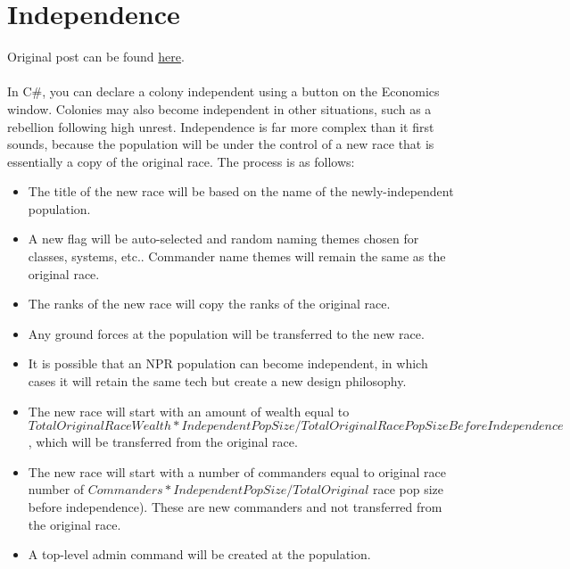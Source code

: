 \documentclass[../../Aurora C# unofficial manual.tex]{subfiles}
\begin{document}
		\section{Independence}\label{6_independence}
	Original post can be found
	\href{http://aurora2.pentarch.org/index.php?topic=8495.msg118467#msg118467}{here}.
	\\\\
	In C\#, you can declare a colony independent using a button on the Economics window. Colonies may also become independent in other situations, such as a rebellion following high unrest. Independence is far more complex than it first sounds, because the population will be under the control of a new race that is essentially a copy of the original race. The process is as follows:
	\begin{itemize}
		\item The title of the new race will be based on the name of the newly-independent population.
		\item A new flag will be auto-selected and random naming themes chosen for classes, systems, etc.. Commander name themes will remain the same as the original race.
		\item The ranks of the new race will copy the ranks of the original race.
		\item Any ground forces at the population will be transferred to the new race.
		\item It is possible that an NPR population can become independent, in which cases it will retain the same tech but create a new design philosophy.
		\item The new race will start with an amount of wealth equal to \( Total Original Race Wealth * Independent Pop Size / Total Original Race Pop Size Before Independence \), which will be transferred from the original race.
		\item The new race will start with a number of commanders equal to original race number of \( Commanders * Independent Pop Size / Total Original \) race pop size before independence). These are new commanders and not transferred from the original race.
		\item A top-level admin command will be created at the population.
	\end{itemize}
	
\end{document}
